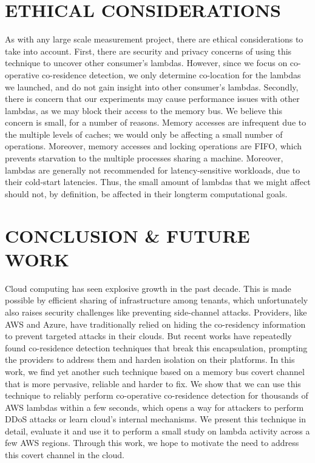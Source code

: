 
\section{ETHICAL CONSIDERATIONS}
As with any large scale measurement project, there are ethical considerations to
take into account. First, there are security and privacy concerns of using this
technique to uncover other consumer's lambdas. However, since we focus on
co-operative co-residence detection, we only determine co-location for the
lambdas we launched, and do not gain insight into other consumer's lambdas.
Secondly, there is concern that our experiments may cause performance issues
with other lambdas, as we may block their access to the memory bus. We believe
this concern is small, for a number of reasons. Memory accesses are infrequent
due to the multiple levels of caches; we would only be affecting a small number
of operations. Moreover, memory accesses and locking operations are FIFO, which
prevents starvation to the multiple processes sharing a machine. Moreover,
lambdas are generally not recommended for latency-sensitive workloads, due to
their cold-start latencies. Thus, the small amount of lambdas that we might
affect should not, by definition, be affected in their longterm computational
goals. 


\section{CONCLUSION \& FUTURE WORK}
\label{sec:conclusion}
Cloud computing has seen explosive growth in the past decade. This is made
possible by efficient sharing of infrastructure among tenants, which
unfortunately also raises security challenges like preventing side-channel
attacks. Providers, like AWS and Azure, have traditionally relied on hiding the
co-residency information to prevent targeted attacks in their clouds. But recent
works have repeatedly found co-residence detection techniques that break this
encapsulation, prompting the providers to address them and harden isolation on
their platforms. In this work, we find yet another such technique based on a
memory bus covert channel that is more pervasive, reliable and harder to fix. We
show that we can use this technique to reliably perform co-operative
co-residence detection for thousands of AWS lambdas within a few seconds, which
opens a way for attackers to perform DDoS attacks or learn cloud's internal
mechanisms. We present this technique in detail, evaluate it and use it to
perform a small study on lambda activity across a few AWS regions.  Through this
work, we hope to motivate the need to address this covert channel in the cloud.

